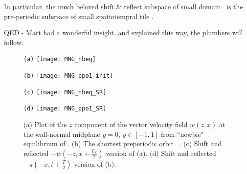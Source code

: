 \begin{description}
{In particular, the much beloved shift \& reflect subspace of small domain \pCf\
is the pre-periodic subspace of  small spatiotempral tile \KS.

QED - Matt had a wonderful insight, and explained this way, the plumbers will follow.
}

\begin{figure}
\begin{minipage}[height=.32\textheight]{.5\textwidth}
\centering \small{\texttt{(a)}}
\texttt{[image: MNG\_nbeq]}
\end{minipage}
\begin{minipage}[height=.32\textheight]{.5\textwidth}
\centering \small{\texttt{(b)}}
\texttt{[image: MNG\_ppo1\_init]}
\end{minipage}
\begin{minipage}[height=.32\textheight]{.5\textwidth}
\centering \small{\texttt{(c)}}
\texttt{[image: MNG\_nbeq\_SR]}
\end{minipage}
\begin{minipage}[height=.32\textheight]{.5\textwidth}
\centering \small{\texttt{(d)}}
\texttt{[image: MNG\_ppo1\_SR]}
\end{minipage}
\caption{ \label{fig:MNG_shiftreflect}
(a) Plot of  the $z$ component of the vector
velocity field $w(z,x)$ at the wall-normal midplane $y=0$, $y \in [-1,1]$
from ``newbie" equilibrium of \pCf.
(b) The shortest preperiodic orbit \KS\ . %
(c) Shift and reflected $-w(-z,x+\frac{L_x}{2})$ version of (a).
(d) Shift and reflected $-u(-x,t+\frac{T}{2})$ version of (b).
}
\end{figure}

\end{description}
